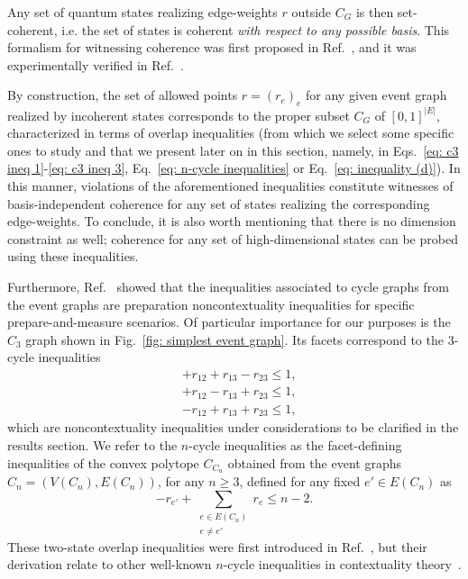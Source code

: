 \documentclass[letterpaper,onecolumn,12pt,accepted=2024-01-17]{article}
\begin{document}
Any set of quantum states realizing edge-weights $r$ outside $C_G$ is then {set-coherent, i.e. the set of states is coherent} \textit{with respect to any possible basis}. This formalism for witnessing coherence was first proposed in Ref.~\cite{galvaobroad2020quantumandclassical}, and it was experimentally verified in Ref.~\cite{giordani2021witnessesofcoherence}.


By construction, { the set of allowed points $r = (r_e)_e$ for any given event graph realized by incoherent states corresponds to the proper subset $C_G$ of $[0,1]^{|E|}$, characterized in terms of overlap inequalities  (from which we select some specific ones to study and that we present later on in this section, namely, in Eqs.~\eqref{eq: c3 ineq 1}-\eqref{eq: c3 ineq 3}, Eq.~\eqref{eq: n-cycle inequalities} or Eq.~\eqref{eq: inequality (d)}). In this manner, violations of the aforementioned inequalities constitute witnesses of basis-independent coherence for any set of states realizing the corresponding edge-weights. To conclude, it is also worth mentioning that} there is no dimension constraint as well; coherence for any set of high-dimensional states can be probed using these inequalities.

Furthermore,  Ref.~\cite{wagner2022inequalities} showed that the inequalities associated to cycle graphs from the event graphs are preparation noncontextuality inequalities for specific prepare-and-measure scenarios. Of particular importance for our purposes is the $C_3$ graph shown in Fig.~\ref{fig: simplest event graph}. Its facets correspond to the { $3$-cycle }inequalities
\begin{align}
    &+r_{12}+r_{13}-r_{23} \leq 1,\label{eq: c3 ineq 1}\\
    &+r_{12}-r_{13}+r_{23} \leq 1,\label{eq: c3 ineq 2}\\
    &-r_{12}+r_{13}+r_{23} \leq 1,\label{eq: c3 ineq 3}
\end{align}
which are noncontextuality inequalities under considerations to be clarified in the results section. { We refer to the $n$-cycle inequalities as the facet-defining inequalities of the convex polytope $C_{C_n}$ obtained from the event graphs $C_n = (V(C_n), E(C_n))$, for any $n\geq 3$, defined for any fixed $e' \in E(C_n)$ as
\begin{equation}\label{eq: n-cycle inequalities}
    -r_{e'} + \sum_{\begin{array}{c}e \in E(C_n)\\ e\neq e' \end{array}}r_e \leq n-2.
\end{equation}
These two-state overlap inequalities were first introduced in Ref.~\cite{galvaobroad2020quantumandclassical}, but their derivation relate to other well-known $n$-cycle inequalities in contextuality theory~\cite{araujo2013all}.}
\end{document}
